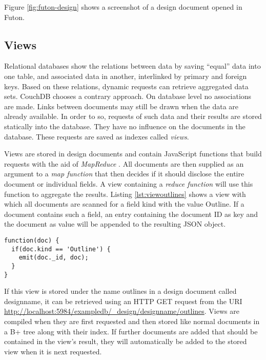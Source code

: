 Figure \ref{fig:futon-design} shows a screenshot of a design document opened in Futon.


\subsection{Views}
\label{subsec:views}

Relational databases show the relations between data by saving \enquote{equal} data into one table, and associated data in another, interlinked by primary and foreign keys. Based on these relations, dynamic requests can retrieve aggregated data sets. CouchDB chooses a contrary approach. On database level no associations are made. Links between documents may still be drawn when the data are already available. In order to so, requests of such data and their results are stored statically into the database. They have no influence on the documents in the database. These requests are saved as indexes called \textit{views}.

Views are stored in design documents and contain JavaScript functions that build requests with the aid of \textit{MapReduce} . All documents are then supplied as an argument to a \textit{map function} that then decides if it should disclose the entire document or individual fields. A view containing a \textit{reduce function} will use this function to aggregate the results. Listing \ref{lst:viewoutlines} shows a view with which all documents are scanned for a field {\selectfont kind} with the value {\selectfont Outline}. If a document contains such a field, an entry containing the document ID as key and the document as value will be appended to the resulting JSON object.

\lstset{language=javascript}
\medskip
\begin{lstlisting}[caption=View: map function to show all outlines, label={lst:viewoutlines}]
function(doc) {
  if(doc.kind == 'Outline') {
    emit(doc._id, doc);
  }
}
\end{lstlisting}


If this view is stored under the name {\selectfont outlines} in a design document called {\selectfont designname}, it can be retrieved using an HTTP GET request from the URI {\url{http://localhost:5984/exampledb/_design/designname/outlines}}. Views are compiled when they are first requested and then stored like normal documents in a B+ tree along with their index. If further documents are added that should be contained in the view's result, they will automatically be added to the stored view when it is next requested.

